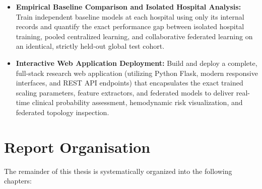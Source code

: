 \begin{itemize}
    \item \textbf{Empirical Baseline Comparison and Isolated Hospital Analysis:} Train independent baseline models at each hospital using only its internal records and quantify the exact performance gap between isolated hospital training, pooled centralized learning, and collaborative federated learning on an identical, strictly held-out global test cohort.
    
    \item \textbf{Interactive Web Application Deployment:} Build and deploy a complete, full-stack research web application (utilizing Python Flask, modern responsive interfaces, and REST API endpoints) that encapsulates the exact trained scaling parameters, feature extractors, and federated models to deliver real-time clinical probability assessment, hemodynamic risk visualization, and federated topology inspection.
\end{itemize}

\section{Report Organisation}
\label{sec:report_organisation}

The remainder of this thesis is systematically organized into the following chapters:

